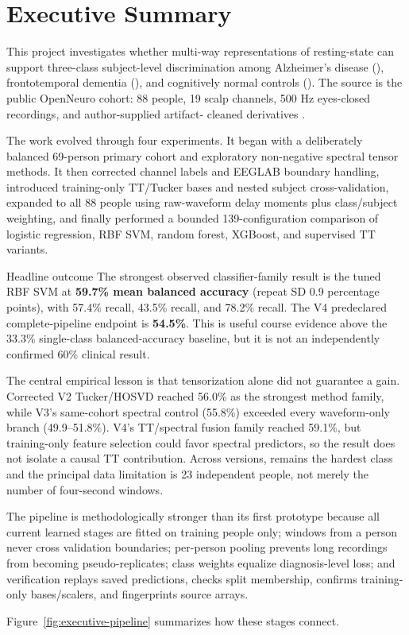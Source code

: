 \chapter*{Executive Summary}

This project investigates whether multi-way representations of resting-state
\EEG{} can support three-class subject-level discrimination among Alzheimer's
disease (\AD), frontotemporal dementia (\FTD), and cognitively normal controls
(\CN). The source is the public OpenNeuro  cohort: 88 people,
19 scalp channels, 500 Hz eyes-closed recordings, and author-supplied artifact-
cleaned derivatives \citep{miltiadous2023dataset,openneuro2026dataset}.

The work evolved through four experiments. It began with a deliberately balanced
69-person primary cohort and exploratory non-negative spectral tensor methods.
It then corrected channel labels and EEGLAB boundary handling, introduced
training-only TT/Tucker bases and nested subject cross-validation, expanded to all
88 people using raw-waveform delay moments plus class/subject weighting, and
finally performed a bounded 139-configuration comparison of logistic regression,
RBF SVM, random forest, XGBoost, and supervised TT variants.

\begin{keybox}{Headline outcome}
The strongest observed classifier-family result is the tuned RBF SVM at
\textbf{59.7\% mean balanced accuracy} (repeat SD 0.9 percentage points), with
57.4\% \AD{} recall, 43.5\% \FTD{} recall, and 78.2\% \CN{} recall. The V4
predeclared complete-pipeline endpoint is \textbf{54.5\%}. This is useful course
evidence above the 33.3\% single-class balanced-accuracy baseline, but it is not
an independently confirmed 60\% clinical result.
\end{keybox}

The central empirical lesson is that tensorization alone did not guarantee a
gain. Corrected V2 Tucker/HOSVD reached 56.0\% as the strongest method family,
while V3's same-cohort spectral control (55.8\%) exceeded every waveform-only
branch (49.9--51.8\%). V4's TT/spectral fusion family reached 59.1\%, but
training-only feature selection could favor spectral predictors, so the result
does not isolate a causal TT contribution. Across versions, \FTD{} remains the
hardest class and the principal data limitation is 23 independent \FTD{} people,
not merely the number of four-second windows.

The pipeline is methodologically stronger than its first prototype because all
current learned stages are fitted on training people only; windows from a person
never cross validation boundaries; per-person pooling prevents long recordings
from becoming pseudo-replicates; class weights equalize diagnosis-level loss;
and verification replays saved predictions, checks split membership, confirms
training-only bases/scalers, and fingerprints source arrays.

Figure~\ref{fig:executive-pipeline} summarizes how these stages connect.


\clearpage
